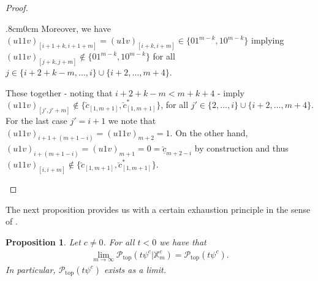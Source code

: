 \documentclass[11pt,reqno]{amsart}
\theoremstyle{plain}
\newtheorem{prop}[theorem]{Proposition}
\theoremstyle{definition}
\newcommand{\X}{{\mathbb X}}
\begin{document}
\begin{proof}
\begin{adjustwidth}{.8cm}{0cm}
Moreover, we have $(u11v)_{[i+1+k,i+1+m]}=(u1v)_{[i+k,i+m]}\in \{01^{m-k},10^{m-k}\}$ implying $(u11v)_{[j+k,j+m]}\notin \{01^{m-k},10^{m-k}\}$ for all $j\in \{i+2+k-m,\ldots, i\}\cup \{i+2,\ldots, m+4\}$.

These together - noting that $i+2+k-m<m+k+4$ - imply 
$(u11v)_{[j',j'+m]}\notin \{\breve{c}_{[1,m+1]}, \breve{c}^\ast_{[1,m+1]}\}$, 
for all 
$j'\in \{ 2, \ldots, i\}\cup \{i+2,\ldots, m+4\}$.
For the last case $j'=i+1$ we note that 
$(u11v)_{i+1+(m+1-i)}=(u11v)_{m+2}=1$. On the other hand, 
$(u1v)_{i+(m+1-i)}=(u1v)_{m+1}=0=\underline{\breve{c}}_{m+2-i}$ by construction and thus $(u11v)_{[i,i+m]}\notin \{\breve{c}_{[1,m+1]}, \breve{c}^\ast_{[1,m+1]}\}$.
\end{adjustwidth}
\end{proof}


The next proposition provides us with a certain  exhaustion principle in the sense of \cite{MR3190211}.
\begin{prop}\label{prop: pm to p}
Let $c \neq 0$. For all $t<0$ we have that 
 \begin{align}
  \lim_{m\to\infty}\mathcal{P}_{\operatorname{top}}\left(t\psi^{c}\lvert\X_m^{c}\right)=\mathcal{P}_{\operatorname{top}}\left(t\psi^{c}\right). \label{eq: P rest= P unrest}
 \end{align}
 In particular, $\mathcal{P}_{\operatorname{top}}\left(t\psi^{c}\right)$ exists as a limit.
\end{prop}
\end{document}
